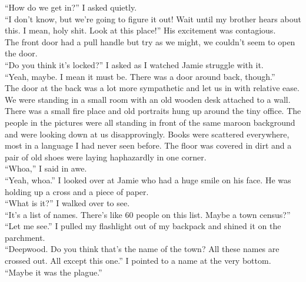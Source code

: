 \documentclass[a5paper]{scrartcl}
\begin{document}
\enquote{How do we get in?} I asked quietly.\\


\enquote{I don't know, but we're going to figure it out! Wait until my brother hears about this. I mean, holy shit. Look at this place!} His excitement was contagious.\\


The front door had a pull handle but try as we might, we couldn't seem to open the door. \\


\enquote{Do you think it's locked?} I asked as I watched Jamie struggle with it.\\


\enquote{Yeah, maybe. I mean it must be. There was a door around back, though.}\\


The door at the back was a lot more sympathetic and let us in with relative ease. We were standing in a small room with an old wooden desk attached to a wall. There was a small fire place and old portraits hung up around the tiny office. The people in the pictures were all standing in front of the same maroon background and were looking down at us disapprovingly. Books were scattered everywhere, most in a language I had never seen before. The floor was covered in dirt and a pair of old shoes were laying haphazardly in one corner.\\


\enquote{Whoa,} I said in awe.\\


\enquote{Yeah, whoa.} I looked over at Jamie who had a huge smile on his face. He was holding up a cross and a piece of paper.\\


\enquote{What is it?} I walked over to see.\\


\enquote{It's a list of names. There's like 60 people on this list. Maybe a town census?}\\


\enquote{Let me see.} I pulled my flashlight out of my backpack and shined it on the parchment. \\


\enquote{Deepwood. Do you think that's the name of the town? All these names are crossed out. All except this one.} I pointed to a name at the very bottom. \\


\enquote{Maybe it was the plague.}\\
\end{document}
